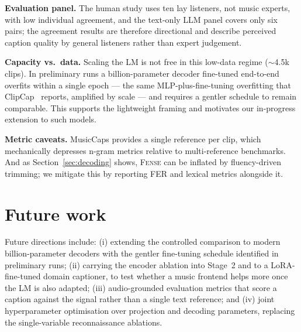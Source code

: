 \documentclass[9pt]{report}
\newcommand{\fense}{\textsc{Fense}}
\begin{document}
\textbf{Evaluation panel.} The human study uses ten lay listeners, not music experts, with low
individual agreement, and the text-only LLM panel covers only six pairs; the agreement results
are therefore directional and describe perceived caption quality by general listeners rather
than expert judgement.

\textbf{Capacity vs.\ data.} Scaling the LM is not free in this low-data regime
($\sim$4.5k clips). In preliminary runs a billion-parameter decoder fine-tuned end-to-end
overfits within a single epoch --- the same MLP-plus-fine-tuning overfitting that
ClipCap~\cite{mokady2021clipcap} reports, amplified by scale --- and requires a gentler schedule
to remain comparable. This supports the lightweight framing and motivates our in-progress
extension to such models.

\textbf{Metric caveats.} MusicCaps provides a single reference per clip, which mechanically
depresses n-gram metrics relative to multi-reference benchmarks. And as
Section~\ref{sec:decoding} shows, \fense{} can be inflated by fluency-driven trimming; we
mitigate this by reporting FER and lexical metrics alongside it.

\section{Future work}

Future directions include: (i) extending the controlled comparison to modern
billion-parameter decoders with the gentler fine-tuning schedule identified in preliminary
runs; (ii) carrying the encoder ablation into Stage~2 and to a LoRA-fine-tuned domain
captioner, to test whether a music frontend helps more once the LM is also adapted;
(iii) audio-grounded evaluation metrics that score a caption against the signal rather than a
single text reference; and (iv) joint hyperparameter optimisation over projection and decoding
parameters, replacing the single-variable reconnaissance ablations.
\end{document}

